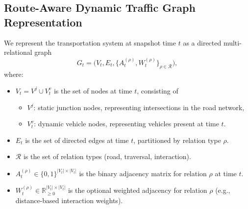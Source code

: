 \documentclass[pdflatex,sn-basic,Numbered]{sn-jnl}%
\begin{document}
\subsection{Route-Aware Dynamic Traffic Graph Representation}\label{sec:dynamic-graph}
We represent the transportation system at snapshot time $t$ as a directed multi-relational graph
\begin{equation}
G_t = \big(V_t, E_t, \{A_t^{(\rho)}, W_t^{(\rho)}\}_{\rho\in\mathcal{R}}\big),
\end{equation}
where:
\begin{itemize}
    \item $V_t = V^j \cup V_t^v$ is the set of nodes at time $t$, consisting of
        \begin{itemize}
            \item $V^j$: static junction nodes, representing intersections in the road network,
            \item $V_t^v$: dynamic vehicle nodes, representing vehicles present at time $t$.
        \end{itemize}
    \item $E_t$ is the set of directed edges at time $t$, partitioned by relation type $\rho$.
    \item $\mathcal{R}$ is the set of relation types (road, traversal, interaction).
    \item $A_t^{(\rho)} \in \{0,1\}^{|V_t|\times |V_t|}$ is the binary adjacency matrix for relation $\rho$ at time $t$.
    \item $W_t^{(\rho)} \in \mathbb{R}_{\ge 0}^{|V_t|\times |V_t|}$ is the optional weighted adjacency for relation $\rho$ (e.g., distance-based interaction weights).
\end{itemize}
\end{document}
